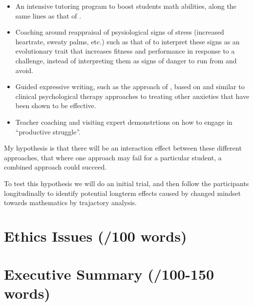 \documentclass[14pt]{memoir}
\begin{document}
\begin{itemize}
	\item An intensive tutoring program to boost students math abilities, along the same lines as that of .
	\item Coaching around reappraisal of psysiological signs of stress (increased heartrate, sweaty palms, etc.) such as that of  to interpret these signs as an evolutionary trait that increases fitness and performance in response to a challenge, instead of interpreting them as signs of danger to run from and avoid.
	\item Guided expressive writing, such as the approach of , based on and similar to clinical psychological therapy approaches to treating other anxieties that have been shown to be effective.
	\item Teacher coaching and visiting expert demonstrtions on how to engage in ``productive struggle''.
\end{itemize}

My hypothesis is that there will be an interaction effect between these different approaches, that where one approach may fail for a particular student, a combined approach could succeed. 

To test this hypothesis we will do an initial trial, and then follow the participants longitudinally to identify potential longterm effects
caused by changed mindset towards mathematics by trajactory analysis. 






\section{Ethics Issues (/100 words)}

\section{Executive Summary (/100-150 words)}



\printglossaries

\glsresetall

 
\end{document}
